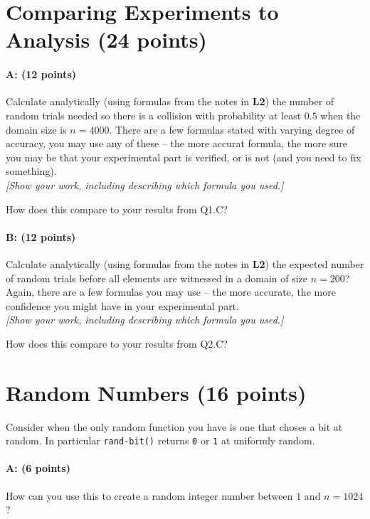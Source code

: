 \documentclass[11pt]{article}
\begin{document}
\section{Comparing Experiments to Analysis (24 points)}

\paragraph{A: (12 points)}
Calculate analytically (using formulas from the notes in \textbf{L2}) the number of random trials needed so there is a collision with probability at least $0.5$ when the domain size is $n = 4000$.  There are a few formulas stated with varying degree of accuracy, you may use any of these -- the more accurat formula, the more sure you may be that your experimental part is verified, or is not (and you need to fix something).  
\\ \emph{[Show your work, including describing which formula you used.]}

How does this compare to your results from \textsf{Q1.C}?  

\paragraph{B: (12 points)}
Calculate analytically (using formulas from the notes in \textbf{L2}) the expected number of random trials before all elements are witnessed in a domain of size $n=200$?  Again, there are a few formulas you may use -- the more accurate, the more confidence you might have in your experimental part.  
\\ \emph{[Show your work, including describing which formula you used.]}

How does this compare to your results from \textsf{Q2.C}?

\section{Random Numbers (16 points)}

Consider when the only random function you have is one that choses a bit at random.  In particular \texttt{rand-bit()} returns \texttt{0} or \texttt{1} at uniformly random.  

\paragraph{A: (6 points)}
How can you use this to create a random integer number between $1$ and $n=1024$?  
\end{document}
